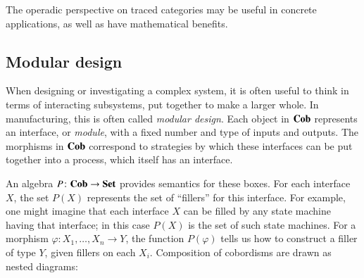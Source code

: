 \documentclass[12pt,oneside,article,draft]{memoir}
\begin{document}
The operadic perspective on traced categories may be useful in concrete applications, as well as have mathematical benefits.

\subsection{Modular design}

When designing or investigating a complex system, it is often useful to think in terms of interacting subsystems, put together to make a larger whole. In manufacturing, this is often called \emph{modular design}. Each object in $\mathbf{Cob}$ represents an interface, or \emph{module}, with a fixed number and type of inputs and outputs. The morphisms in $\mathbf{Cob}$ correspond to strategies by which these interfaces can be put together into a process, which itself has an interface. 

An algebra $P\colon\mathbf{Cob}\to\mathbf{Set}$ provides semantics for these boxes. For each interface $X$, the set $P(X)$ represents the set of ``fillers'' for this interface. For example, one might imagine that each interface $X$ can be filled by any state machine having that interface; in this case $P(X)$ is the set of such state machines. For a morphism $\varphi\colon X_1,\ldots,X_n\to Y$, the function $P(\varphi)$ tells us how to construct a filler of type $Y$, given fillers on each $X_i$. Composition of cobordisms are drawn as nested diagrams:
\end{document}

